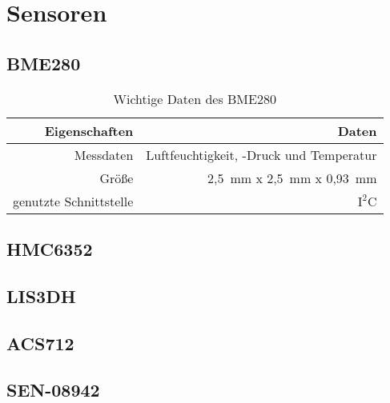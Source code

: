 %

\section{Sensoren}

\subsection{BME280}


\begin{table}[ht]
  \caption{Wichtige Daten des BME280}\label{table:Daten_BME280}
  \begin{center}
    \begin{tabular}{r|r}
      \textbf{Eigenschaften} & \textbf{Daten}\\
      \hline
      Messdaten & Luftfeuchtigkeit, -Druck und Temperatur\\
      Größe &  2,5~mm x 2,5~mm x 0,93~mm\\
      genutzte Schnittstelle & $\text{I}^2$C\\
      
    \end{tabular}
  \end{center}
\end{table}

\subsection{HMC6352}


\subsection{LIS3DH}



\subsection{ACS712}


\subsection{SEN-08942}

